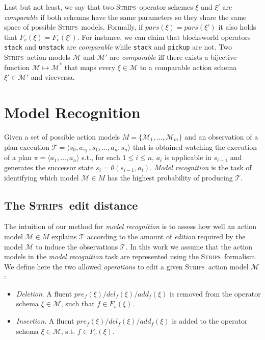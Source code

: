 \documentclass[letterpaper]{article} %
\newcommand{\tup}[1]{{\langle #1 \rangle}}
\newcommand{\strips}{\textsc{Strips}}     %
\begin{document}
Last but not least, we say that two \strips\ operator schemes $\xi$ and $\xi'$ are {\em comparable} if both schemas have the same parameters so they share the same space of possible \strips\ models. Formally, if $pars(\xi)=pars(\xi')$ it also holds that $F_v(\xi)=F_v(\xi')$. For instance, we can claim that blocksworld operators {\tt stack} and {\tt unstack} are {\em comparable} while  {\tt stack} and {\tt pickup} are not. Two \strips\ action models $\mathcal{M}$ and $\mathcal{M}'$ are {\em comparable} iff there exists a bijective function $\mathcal{M} \mapsto \mathcal{M}^*$ that maps every $\xi\in\mathcal{M}$ to a comparable action schema $\xi'\in\mathcal{M'}$ and viceversa.


\section{Model Recognition}
\label{sec:section4}
Given a set of possible action models $M=\{\mathcal{M}_1,\ldots,\mathcal{M}_m\}$ and an observation of a plan execution $\mathcal{T}=\tup{s_0,a,_1,s_1,\ldots,a_n,s_{n}}$ that is obtained watching the execution of a plan $\pi=\tup{a_1, \ldots, a_n}$ s.t., for each {\small $1\leq i\leq n$}, $a_i$ is applicable in $s_{i-1}$ and generates the successor state $s_i=\theta(s_{i-1},a_i)$. {\em Model recognition} is the task of identifying which model $\mathcal{M}\in M$ has the highest probability of producing $\mathcal{T}$.

\subsection{The \strips\ edit distance}
The intuition of our method for {\em model recognition} is to assess how well an action model $\mathcal{M}\in M$ explains $\mathcal{T}$ according to the amount of {\em edition} required by the model $\mathcal{M}$ to induce the observations $\mathcal{T}$. In this work we assume that the action models in the {\em model recognition} task are represented using the \strips\ formalism. We define here the two allowed \emph{operations} to edit a given \strips\ action model $\mathcal{M}$:
\begin{itemize}
\item {\em Deletion}. A fluent $pre_f(\xi)/del_f(\xi)/add_f(\xi)$ is removed from the operator schema $\xi\in\mathcal{M}$, such that $f\in F_v(\xi)$.
\item {\em Insertion}. A fluent $pre_f(\xi)/del_f(\xi)/add_f(\xi)$ is added to the operator schema $\xi\in\mathcal{M}$, s.t. $f\in F_v(\xi)$.
\end{itemize}
\end{document}
